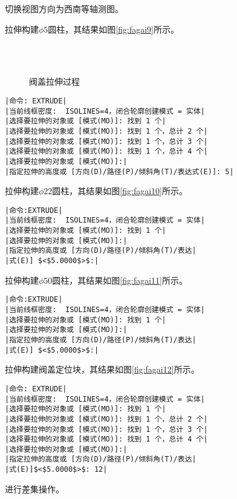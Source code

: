 
\begin{procedure}
\item 切换视图方向为西南等轴测图。
\item 拉伸构建$\phi 5$圆柱，其结果如图\ref{fig:fagai9}所示。
\begin{figure}[htbp]
\centering
{}\hspace{30pt}
\\
\hspace{30pt}
\\
\caption{阀盖拉伸过程}
\end{figure}
\begin{lstlisting}
|命令: EXTRUDE|
|当前线框密度:  ISOLINES=4，闭合轮廓创建模式 = 实体|
|选择要拉伸的对象或 [模式(MO)]: 找到 1 个|
|选择要拉伸的对象或 [模式(MO)]: 找到 1 个，总计 2 个|
|选择要拉伸的对象或 [模式(MO)]: 找到 1 个，总计 3 个|
|选择要拉伸的对象或 [模式(MO)]: 找到 1 个，总计 4 个|
|选择要拉伸的对象或 [模式(MO)]:|
|指定拉伸的高度或 [方向(D)/路径(P)/倾斜角(T)/表达式(E)]: 5|
\end{lstlisting}

\item 拉伸构建$\phi 22$圆柱，其结果如图\ref{fig:fagai10}所示。
\begin{lstlisting}
|命令:EXTRUDE|
|当前线框密度:  ISOLINES=4，闭合轮廓创建模式 = 实体|
|选择要拉伸的对象或 [模式(MO)]: 找到 1 个|
|选择要拉伸的对象或 [模式(MO)]:|
|指定拉伸的高度或 [方向(D)/路径(P)/倾斜角(T)/表达|
|式(E)] $<$5.0000$>$:|
\end{lstlisting}
\item 拉伸构建$\phi 50$圆柱，其结果如图\ref{fig:fagai11}所示。
\begin{lstlisting}
|命令:EXTRUDE|
|当前线框密度:  ISOLINES=4，闭合轮廓创建模式 = 实体|
|选择要拉伸的对象或 [模式(MO)]: 找到 1 个|
|选择要拉伸的对象或 [模式(MO)]:|
|指定拉伸的高度或 [方向(D)/路径(P)/倾斜角(T)/表达|
|式(E)] $<$5.0000$>$:|
\end{lstlisting}
\item 拉伸构建阀盖定位块，其结果如图\ref{fig:fagai12}所示。
\begin{lstlisting}
|命令: EXTRUDE|
|当前线框密度:  ISOLINES=4，闭合轮廓创建模式 = 实体|
|选择要拉伸的对象或 [模式(MO)]: 找到 1 个|
|选择要拉伸的对象或 [模式(MO)]: 找到 1 个，总计 2 个|
|选择要拉伸的对象或 [模式(MO)]: 找到 1 个，总计 3 个|
|选择要拉伸的对象或 [模式(MO)]: 找到 1 个，总计 4 个|
|选择要拉伸的对象或 [模式(MO)]:|
|指定拉伸的高度或 [方向(D)/路径(P)/倾斜角(T)/表达|
|式(E)]$<$5.0000$>$: 12|
\end{lstlisting}
\item 进行差集操作。


\end{procedure}
